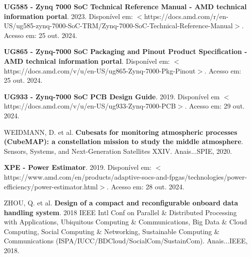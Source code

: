 \begin{flushleft}
\begin{thebibliography}{00}
 \textbf{UG585 - Zynq 7000 SoC Technical Reference Manual - AMD technical information portal}. 2023. Disponível em: $<$https://docs.amd.com/r/en-US/ug585-zynq-7000-SoC-TRM/Zynq-7000-SoC-Technical-Reference-Manual$>$. Acesso em: 25 out. 2024.

 \textbf{UG865 - Zynq-7000 SoC Packaging and Pinout Product Specification - AMD technical information portal}. Disponível em: $<$https://docs.amd.com/v/u/en-US/ug865-Zynq-7000-Pkg-Pinout$>$. Acesso em: 25 out. 2024.

 \textbf{UG933 - Zynq-7000 SoC PCB Design Guide}. 2019. Disponível em $<$https://docs.amd.com/v/u/en-US/ug933-Zynq-7000-PCB$>$. Acesso em: 29 out. 2024.

 WEIDMANN, D. et al. \textbf{Cubesats for monitoring atmospheric processes (CubeMAP): a constellation mission to study the middle atmosphere}. Sensors, Systems, and Next-Generation Satellites XXIV. Anais...SPIE, 2020.

 \textbf{XPE - Power Estimator}. 2019. Disponível em: $<$https://www.amd.com/en/products/adaptive-socs-and-fpgas/technologies/power-efficiency/power-estimator.html$>$. Acesso em: 28 out. 2024.

 ZHOU, Q. et al. \textbf{Design of a compact and reconfigurable onboard data handling system}. 2018 IEEE Intl Conf on Parallel \& Distributed Processing with Applications, Ubiquitous Computing \& Communications, Big Data \& Cloud Computing, Social Computing \& Networking, Sustainable Computing \& Communications (ISPA/IUCC/BDCloud/SocialCom/SustainCom). Anais...IEEE, 2018.
















\end{thebibliography}
\end{flushleft}


